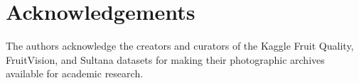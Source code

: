 \documentclass[3p,times,procedia]{elsarticle}
\begin{document}








\section*{Acknowledgements}
The authors acknowledge the creators and curators of the Kaggle Fruit Quality, FruitVision, and Sultana datasets for making their photographic archives available for academic research.



\end{document}
